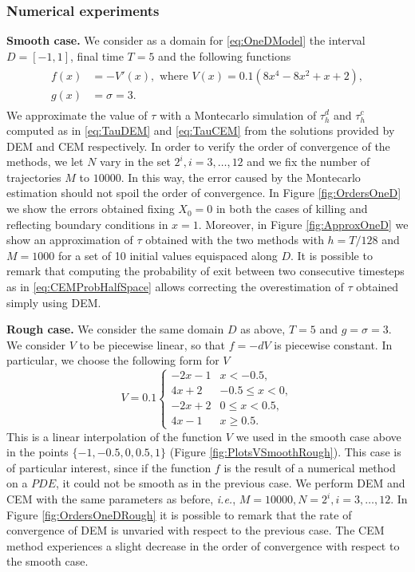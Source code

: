 \subsubsection{Numerical experiments}

\textbf{Smooth case.} We consider as a domain for \eqref{eq:OneDModel} the interval $D = \left[-1,1\right]$, final time $T = 5$ and the following functions
\begin{align}\label{eq:FunctionsOneDSmooth}
\begin{split}
	f(x) &= -V'(x), \text{ where } V(x) = 0.1(8x^4 - 8x^2 + x + 2), \\
	g(x) &= \sigma = 3.
\end{split}
\end{align}
We approximate the value of $\tau$ with a Montecarlo simulation of $\tau_h^d$ and $\tau_h^c$ computed as in \eqref{eq:TauDEM} and \eqref{eq:TauCEM} from the solutions provided by DEM and CEM respectively. In order to verify the order of convergence of the methods, we let $N$ vary in the set $2^i,i=3,\dots,12$ and we fix the number of trajectories $M$ to $10000$. In this way, the error caused by the Montecarlo estimation should not spoil the order of convergence. In Figure \ref{fig:OrdersOneD} we show the errors obtained fixing $X_0 = 0$ in both the cases of killing and reflecting boundary conditions in $x = 1$. Moreover, in Figure \ref{fig:ApproxOneD} we show an approximation of $\tau$ obtained with the two methods with $h = T/128$ and $M = 1000$ for a set of 10 initial values equispaced along $D$. It is possible to remark that computing the probability of exit between two consecutive timesteps as in \eqref{eq:CEMProbHalfSpace} allows correcting the overestimation of $\tau$ obtained simply using DEM.



\vspace{2mm}
\noindent\textbf{Rough case.} We consider the same domain $D$ as above, $T = 5$ and $g = \sigma = 3$. We consider $V$ to be piecewise linear, so that $f = -dV$ is piecewise constant. In particular, we choose the following form for $V$
\begin{equation}\label{eq:FunctionsOneDRough}
V = 0.1 
\begin{cases}
	 -2x -1 & x < -0.5, \\
	 4x + 2 & -0.5 \leq x < 0, \\
	 -2x + 2 &  0 \leq x < 0.5, \\
	 4x - 1 & x \geq 0.5.
\end{cases}
\end{equation}
This is a linear interpolation of the function $V$ we used in the smooth case above in the points $\{-1,-0.5,0,0.5,1\}$ (Figure \ref{fig:PlotsVSmoothRough}). This case is of particular interest, since if the function $f$ is the result of a numerical method on a $PDE$, it could not be smooth as in the previous case. We perform DEM and CEM with the same parameters as before, \textit{i.e.}, $M = 10000, N = 2^i,i=3,\dots,12$. In Figure \ref{fig:OrdersOneDRough} it is possible to remark that the rate of convergence of DEM is unvaried with respect to the previous case. The CEM method experiences a slight decrease in the order of convergence with respect to the smooth case.

